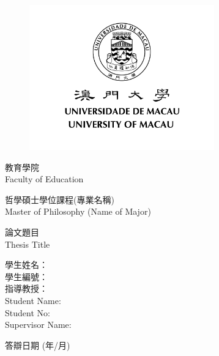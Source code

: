 \begin{titlepage}
    \begin{figure}
        \centering
        \includegraphics[width=8cm]{Title/UM_logo.png}

    \end{figure}
    \smallskip
    \begin{center}
        \Large
        教育學院 \\
        Faculty of Education \\
    \end{center}
    \smallskip
    \begin{center}
        哲學碩士學位課程(專業名稱) \\
        Master of Philosophy (Name of Major)
    \end{center}
    \smallskip
    \begin{center}
    	
        \large
        論文題目 \\ 
        Thesis Title \\ 
        
         
    \end{center}
    \vfill
    \begin{flushleft}
        \begin{multicols}{2}
            學生姓名： \\
            學生編號： \\
            指導教授：\\
            \columnbreak
            Student Name:  \\
            Student No:  \\
            Supervisor Name:  \\
        \end{multicols}
    \end{flushleft}
    \smallskip
    \begin{center}
        答辯日期 (年/月) \\
        
    \end{center}
\end{titlepage}
\newpage
